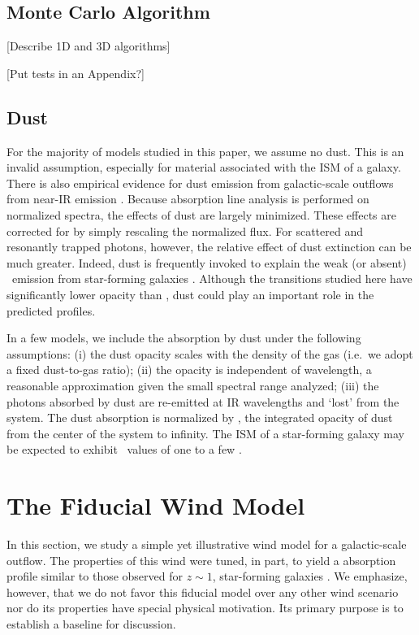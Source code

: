 \documentclass[12pt,preprint]{aastex}
\begin{document}
\subsection{Monte Carlo Algorithm}

[Describe 1D and 3D algorithms]

[Put tests in an Appendix?]

\subsection{Dust}
\label{sec:dust_method}

For the majority of models studied in this paper, we assume no dust.
This is an invalid assumption, especially for material associated with
the ISM of a galaxy.  
There is also empirical evidence for dust emission from galactic-scale
outflows from near-IR emission \citep[e.g.][]{M87_dust}.
Because absorption line analysis is performed
on normalized spectra, the effects of dust are largely minimized.  
These effects are corrected for by simply rescaling the normalized
flux.  For
scattered and resonantly trapped photons, however, the relative effect of dust
extinction can be much greater.  Indeed, dust is frequently invoked to
explain the weak (or absent) \lya\ emission from star-forming galaxies
\citep[e.g.][]{shapley03}.  Although the transitions studied here have
significantly lower opacity than \lya, dust could play an important role
in the predicted profiles.

In a few models, we include the absorption by dust under the following
assumptions:
(i) the dust opacity scales with the density of the gas (i.e.\ we
adopt a fixed dust-to-gas ratio);
(ii) the opacity is independent of wavelength, a reasonable
approximation given the small spectral range analyzed;
(iii) the photons absorbed by dust are re-emitted at IR wavelengths
and `lost' from the system.  The dust absorption is normalized by \taud, 
the integrated opacity of dust from the center of the system to
infinity.  The ISM of a star-forming galaxy may be expected to exhibit
\taud\ values of one to a few \citep[e.g.][]{dust_again}.



\section{The Fiducial Wind Model}
\label{sec:fiducial}

In this section, we study a simple yet illustrative wind model for
a galactic-scale outflow.  The properties of this wind were tuned, in
part, to yield a  absorption profile 
similar to those observed for $z \sim 1$, star-forming galaxies
\citep{wcp+09,rubin+10b}.  We emphasize, however, that we do not
favor this fiducial model over any other wind scenario nor do its
properties have special physical motivation.
Its primary purpose is to establish a baseline
for discussion.
\end{document}

